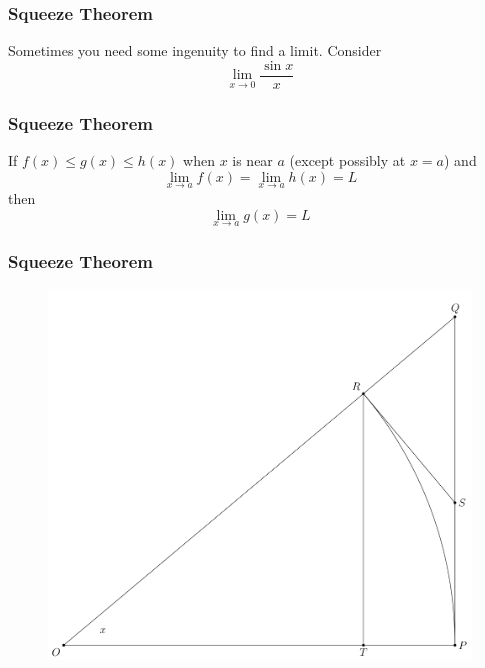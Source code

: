 \documentclass[xcolor=dvipsnames]{beamer}
\begin{document}
\begin{frame}
  \frametitle{Squeeze Theorem}
Sometimes you need some ingenuity to find a limit. Consider
\begin{equation}
  \label{eq:iepichae}
  \lim_{x\rightarrow{}0}\frac{\sin{}x}{x}
\end{equation}
\end{frame}

\begin{frame}
  \frametitle{Squeeze Theorem}
  If $f(x)\leq{}g(x)\leq{}h(x)$ when $x$ is near $a$ (except possibly
  at $x=a$) and
  \begin{equation}
    \label{eq:ohphaese}
    \lim_{x\rightarrow{}a}f(x)=\lim_{x\rightarrow{}a}h(x)=L
  \end{equation}
  then
  \begin{equation}
    \label{eq:quaighea}
    \lim_{x\rightarrow{}a}g(x)=L
  \end{equation}
\end{frame}

\begin{frame}
  \frametitle{Squeeze Theorem}
\begin{figure}[h]
\includegraphics[scale=.24]{./diagrams/limsinxoverx.png}
\end{figure}
\end{frame}
\end{document}
